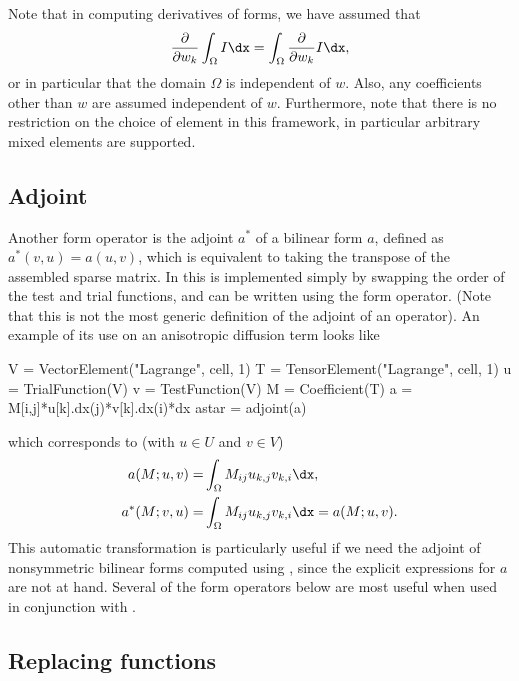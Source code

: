 Note that in computing derivatives of forms, we have assumed that
\begin{align}
\frac{\partial}{\partial w_k} \int_\Omega I \dx
= \int_\Omega \frac{\partial}{\partial w_k} I \dx,
\end{align}
or in particular that the domain $\Omega$ is independent of $w$.
Also, any coefficients other than $w$ are assumed independent of $w$.
Furthermore, note that there is no restriction on the choice of element
in this framework, in particular arbitrary mixed elements are supported.

\subsection{Adjoint}
\label{ufl:sec:adjoint}

Another form operator is the adjoint $a^*$ of a bilinear form $a$,
defined as $a^*(v,u) = a(u,v)$, which is equivalent to taking the transpose
of the assembled sparse matrix.  In \ufl{} this is implemented simply
by swapping the order of the test and trial functions, and can be written using the
 form operator.
(Note that this is not the most generic definition of the adjoint of an operator).
An example of its use on an anisotropic
diffusion term looks like
\begin{uflcode}
V = VectorElement("Lagrange", cell, 1)
T = TensorElement("Lagrange", cell, 1)
u = TrialFunction(V)
v = TestFunction(V)
M = Coefficient(T)
a = M[i,j]*u[k].dx(j)*v[k].dx(i)*dx
astar = adjoint(a)
\end{uflcode}
which corresponds to (with $u \in U$ and $v \in V$)
\begin{align}
a(M; u, v) =& \int_\Omega M_{ij} u_{k,j} v_{k,i} \dx, \\
a^*(M; v, u) =& \int_\Omega  M_{ij} u_{k,j} v_{k,i} \dx = a(M; u, v).
\end{align}
This automatic transformation is particularly useful if we need the
adjoint of nonsymmetric bilinear forms computed using
, since the explicit expressions for $a$ are not at
hand.  Several of the form operators below are most useful when used
in conjunction with .

\subsection{Replacing functions}
\label{ufl:sec:replace}

